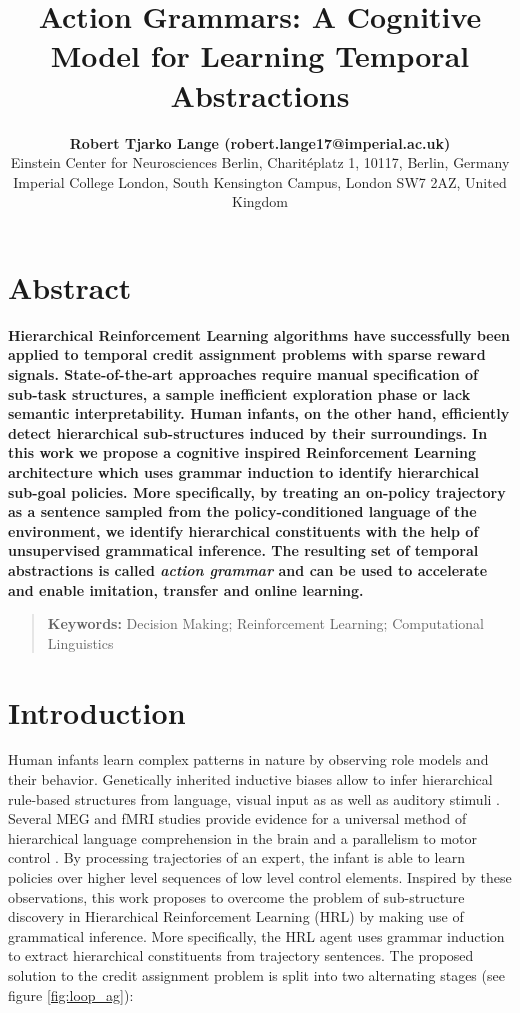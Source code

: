 \documentclass[10pt,letterpaper]{article}
\title{Action Grammars: A Cognitive Model for Learning Temporal Abstractions}
\author{{\large \bf Robert Tjarko Lange (robert.lange17@imperial.ac.uk)} \\
  Einstein Center for Neurosciences Berlin, Charitéplatz 1, 10117, Berlin, Germany \AND {\large \bf Aldo Faisal (a.faisal@imperial.ac.uk)} \\
  Imperial College London, South Kensington Campus, London SW7 2AZ, United Kingdom}
\begin{document}
\maketitle


\section{Abstract}
{
\bf
Hierarchical Reinforcement Learning algorithms have successfully been applied to temporal credit assignment problems with sparse reward signals. State-of-the-art approaches require manual specification of sub-task structures,  a sample inefficient exploration phase or lack semantic interpretability. Human infants, on the other hand, efficiently detect hierarchical sub-structures induced by their surroundings.
In this work we propose a cognitive inspired Reinforcement Learning architecture which uses grammar induction to identify hierarchical sub-goal policies. More specifically, by treating an on-policy trajectory as a sentence sampled from the policy-conditioned language of the environment, we identify hierarchical constituents with the help of unsupervised grammatical inference. The resulting set of temporal abstractions is called \textit{action grammar} \cite{Pastra_2012} and can be used to accelerate and enable imitation, transfer and online learning.
}
\begin{quote}
\small
\textbf{Keywords:} 
Decision Making; Reinforcement Learning; Computational Linguistics
\end{quote}

\section{Introduction}

Human infants learn complex patterns in nature by observing role models and their behavior. Genetically inherited inductive biases allow to infer hierarchical rule-based structures from language, visual input as as well as auditory stimuli \cite{Frank_2009, Marcus_2007}. Several MEG and fMRI studies provide evidence for a universal method of hierarchical language comprehension in the brain \cite{Frank_2018, Brennan_2016, Nelson_2017} and a parallelism to motor control \cite{Pastra_2012, Stout_2018}. By processing trajectories of an expert, the infant is able to learn policies over higher level sequences of low level control elements.
Inspired by these observations, this work proposes to overcome the problem of sub-structure discovery in Hierarchical Reinforcement Learning (HRL) by making use of grammatical inference. More specifically, the HRL agent uses grammar induction to extract hierarchical constituents from trajectory sentences. The proposed solution to the credit assignment problem is split into two alternating stages (see figure \ref{fig:loop_ag}):
\end{document}
